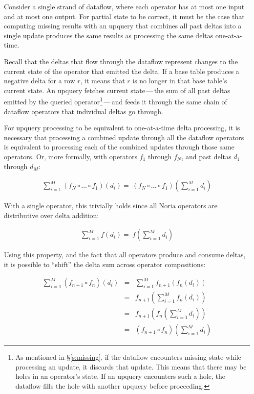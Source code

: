 Consider a single strand of dataflow, where each operator has at most one input
and at most one output. For partial state to be correct, it must be the case
that computing missing results with an upquery that combines all past deltas
into a single update produces the same results as processing the same deltas
one-at-a-time.

Recall that the deltas that flow through the dataflow represent changes to the
current state of the operator that emitted the delta. If a base table produces
a negative delta for a row $r$, it means that $r$ is no longer in that base
table's current state. An upquery fetches current state\,---\,the sum of all
past deltas emitted by the queried operator\footnote{As mentioned in
\S\ref{s:missing}, if the dataflow encounters missing state while processing an
update, it discards that update. This means that there may be holes in an
operator's state. If an upquery encounters such a hole, the dataflow fills the
hole with another upquery before proceeding.}\,---\,and feeds it through the
same chain of dataflow operators that individual deltas go through.

For upquery processing to be equivalent to one-at-a-time delta processing, it is
necessary that processing a combined update through all the dataflow operators
is equivalent to processing each of the combined updates through those same
operators. Or, more formally, with operators $f_1$ through $f_N$, and past
deltas $d_1$ through $d_M$:

\begin{eqnarray*}
  \sum^M_{i=1}\left(f_N \circ \dots \circ f_1\right)\left(d_i\right) = \
  \left(f_N \circ \dots \circ f_1\right)\left(\sum^M_{i=1}d_i\right)
\end{eqnarray*}

With a single operator, this trivially holds since all Noria operators are
distributive over delta addition:

\begin{eqnarray*}
  \sum^M_{i=1}f\left(d_i\right) = \
  f\left(\sum^M_{i=1}d_i\right)
\end{eqnarray*}

Using this property, and the fact that all operators produce and consume deltas,
it is possible to ``shift'' the delta sum across operator compositions:

\begin{eqnarray*}
  \sum^M_{i=1}\left(f_{n+1} \circ f_n\right)\left(d_i\right) &=& \sum^M_{i=1}f_{n+1}\left(f_n\left(d_i\right)\right) \\
  &=& f_{n+1}\left(\sum^M_{i=1}f_n\left(d_i\right)\right) \\
  &=& f_{n+1}\left(f_n\left(\sum^M_{i=1}d_i\right)\right) \\
  &=& \left(f_{n+1} \circ f_n\right)\left(\sum^M_{i=1}d_i\right)
\end{eqnarray*}

